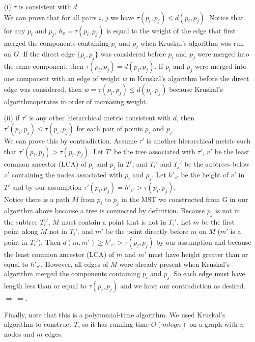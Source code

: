 \documentclass[11pt]{article}
\begin{document}
(i) $\tau$ is consistent with $d$\\

We can prove that for all pairs $i$, $j$ we have $\tau(p_i, p_j) \leq d(p_i, p_j)$. Notice that for any $p_i$ and $p_j$, $h_v = \tau(p_i, p_j)$ is equal to the weight of the edge that first merged the components containing $p_i$ and $p_j$ when Kruskal's algorithm was run on $G$. If the direct edge $\{p_i, p_j\}$ was considered before $p_i$ and $p_j$ were merged into the same component, then $\tau(p_i, p_j) = d(p_i, p_j)$. If $p_i$ and $p_j$ were merged into one component with an edge of weight $w$ in Kruskal's algorithm before the direct edge was considered, then $w = \tau(p_i, p_j) \leq d(p_i, p_j)$ because Kruskal's algorithmoperates in order of increasing weight.

(ii) if $\tau'$ is any other hierarchical metric consistent with $d$, then $\tau'(p_i, p_j) \leq \tau(p_i, p_j)$ for each pair of points $p_i$ and $p_j$.\\

We can prove this by contradiction. Assume $\tau'$ is another hierarchical metric such that $\tau'(p_i, p_j) > \tau(p_i, p_j)$. Let $T'$ be the tree associated with $\tau'$, $v'$ be the least common ancestor (LCA) of $p_i$ and $p_j$ in $T'$, and $T_i'$ and $T_j'$ be the subtrees below $v'$ containing the nodes associated with $p_i$ and $p_j$. Let ${h'}_{v'}$ be the height of $v'$ in $T'$ and by our assumption $\tau'(p_i, p_j) = {h'}_{v'} > \tau(p_i, p_j)$.\\

Notice there is a path $M$ from $p_i$ to $p_j$ in the MST we constructed from G in our algorithm above because a tree is connected by definition. Because $p_j$ is not in the subtree $T_i'$, $M$ must contain a point that is not in $T_i'$. Let $m$ be the first point along $M$ not in $T_i'$, and $m'$ be the point directly before $m$ on $M$ ($m'$ is a point in $T_i'$). Then $d(m, m') \geq {h'}_{v'} > \tau(p_i, p_j)$ by our assumption and because the least common ancestor (LCA) of $m$ and $m'$ must have height greater than or equal to ${h'}_{v'}$. However, all edges of $M$ were already present when Kruskal's algorithm merged the components containing $p_i$ and $p_j$. So each edge must have length less than or equal to $\tau(p_i, p_j)$ and we have our contradiction as desired. $\Rightarrow \Leftarrow$.\newline

Finally, note that this is a polynomial-time algorithm. We used Kruskal's algorithm to construct $T$, so it has running time $O(m logn)$ on a graph with $n$ nodes and $m$ edges.
\end{document}
